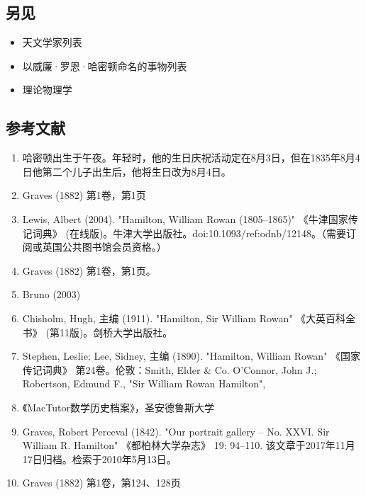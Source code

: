 \subsection{另见} 
\begin{itemize}
\item 天文学家列表  
\item 以威廉·罗恩·哈密顿命名的事物列表  
\item 理论物理学
\end{itemize}
\subsection{参考文献} 
\begin{enumerate}
\item 哈密顿出生于午夜。年轻时，他的生日庆祝活动定在8月3日，但在1835年8月4日他第二个儿子出生后，他将生日改为8月4日。  
\item Graves (1882) 第1卷，第1页  
\item Lewis, Albert (2004). "Hamilton, William Rowan (1805–1865)" 《牛津国家传记词典》 (在线版)。牛津大学出版社。doi:10.1093/ref:odnb/12148。（需要订阅或英国公共图书馆会员资格。）  
\item Graves (1882) 第1卷，第1页。  
\item Bruno (2003)  
\item Chisholm, Hugh, 主编 (1911). "Hamilton, Sir William Rowan" 《大英百科全书》 (第11版)。剑桥大学出版社。  
\item Stephen, Leslie; Lee, Sidney, 主编 (1890). "Hamilton, William Rowan" 《国家传记词典》 第24卷。伦敦：Smith, Elder & Co.  
O'Connor, John J.; Robertson, Edmund F., "Sir William Rowan Hamilton", \item 《MacTutor数学历史档案》，圣安德鲁斯大学  
\item Graves, Robert Perceval (1842). "Our portrait gallery – No. XXVI. Sir William R. Hamilton" 《都柏林大学杂志》 19: 94–110. 该文章于2017年11月17日归档。检索于2010年5月13日。  
\item Graves (1882) 第1卷，第124、128页


\end{enumerate}
